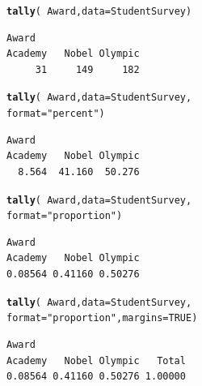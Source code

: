 \documentclass[10pt]{report}\usepackage[]{graphicx}\usepackage[]{xcolor}
\makeatletter
\newcommand{\hlnum}[1]{\textcolor[rgb]{0.686,0.059,0.569}{#1}}%
\newcommand{\hlsng}[1]{\textcolor[rgb]{0.192,0.494,0.8}{#1}}%
\newcommand{\hlopt}[1]{\textcolor[rgb]{0,0,0}{#1}}%
\newcommand{\hldef}[1]{\textcolor[rgb]{0.345,0.345,0.345}{#1}}%
\newcommand{\hlkwc}[1]{\textcolor[rgb]{0.333,0.667,0.333}{#1}}%
\newcommand{\hlkwd}[1]{\textcolor[rgb]{0.737,0.353,0.396}{\textbf{#1}}}%
\newenvironment{kframe}{%
 \def\at@end@of@kframe{}%
 \ifinner\ifhmode%
  \def\at@end@of@kframe{\end{minipage}}%
  \begin{minipage}{\columnwidth}%
 \fi\fi%
 \def\FrameCommand##1{\hskip\@totalleftmargin \hskip-\fboxsep
 \colorbox{shadecolor}{##1}\hskip-\fboxsep
     \hskip-\linewidth \hskip-\@totalleftmargin \hskip\columnwidth}%
 \MakeFramed {\advance\hsize-\width
   \@totalleftmargin\z@ \linewidth\hsize
   \@setminipage}}%
 {\par\unskip\endMakeFramed%
 \at@end@of@kframe}
\newenvironment{knitrout}{}{} %
\makeatother
\begin{document}
\begin{multicols}{3}
\begin{knitrout}\small
{}\color{fgcolor}\begin{kframe}
\begin{alltt}
\hlkwd{tally}\hldef{(}\hlopt{~} \hldef{Award,} \hlkwc{data} \hldef{= StudentSurvey)}
\end{alltt}
\begin{verbatim}
Award
Academy   Nobel Olympic 
     31     149     182 
\end{verbatim}
\end{kframe}
\end{knitrout}
\vspace*{-.20in}
\begin{knitrout}\small
{}\color{fgcolor}\begin{kframe}
\begin{alltt}
\hlkwd{tally}\hldef{(}\hlopt{~} \hldef{Award,} \hlkwc{data} \hldef{= StudentSurvey,}
      \hlkwc{format} \hldef{=} \hlsng{"percent"}\hldef{)}
\end{alltt}
\begin{verbatim}
Award
Academy   Nobel Olympic 
  8.564  41.160  50.276 
\end{verbatim}
\end{kframe}
\end{knitrout}
\vspace*{-.20in}
\begin{knitrout}\small
{}\color{fgcolor}\begin{kframe}
\begin{alltt}
\hlkwd{tally}\hldef{(}\hlopt{~} \hldef{Award,} \hlkwc{data} \hldef{= StudentSurvey,}
      \hlkwc{format} \hldef{=} \hlsng{"proportion"}\hldef{)}
\end{alltt}
\begin{verbatim}
Award
Academy   Nobel Olympic 
0.08564 0.41160 0.50276 
\end{verbatim}
\end{kframe}
\end{knitrout}
\vspace*{-.20in}
\begin{knitrout}\small
{}\color{fgcolor}\begin{kframe}
\begin{alltt}
\hlkwd{tally}\hldef{(}\hlopt{~} \hldef{Award,} \hlkwc{data} \hldef{= StudentSurvey,}
      \hlkwc{format} \hldef{=} \hlsng{"proportion"}\hldef{,} \hlkwc{margins} \hldef{=} \hlnum{TRUE}\hldef{)}
\end{alltt}
\begin{verbatim}
Award
Academy   Nobel Olympic   Total 
0.08564 0.41160 0.50276 1.00000 
\end{verbatim}
\end{kframe}
\end{knitrout}
\vspace*{-.20in}


\end{multicols}
\end{document}

